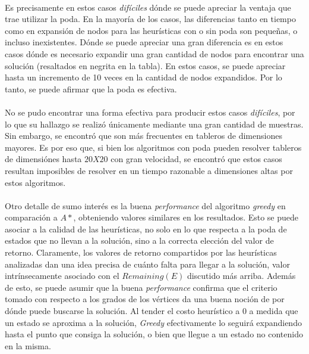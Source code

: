 \documentclass[12pt, twocolumn]{article}
\begin{document}
\paragraph{} Es precisamente en estos casos \textit{difíciles} dónde se puede apreciar la ventaja que trae utilizar
la poda. En la mayoría de los casos, las diferencias tanto en tiempo como en expansión de nodos
para las heurísticas con o sin poda son pequeñas, o incluso inexistentes. Dónde se puede apreciar
una gran diferencia es en estos casos dónde es necesario expandir una gran cantidad de nodos para
encontrar una solución (resaltados en negrita en la tabla). En estos casos, se puede apreciar hasta
un incremento de 10 veces en la cantidad de nodos expandidos. Por lo tanto, se puede afirmar que la 
poda es efectiva.

\paragraph{} No se pudo encontrar una forma efectiva para producir estos casos \textit{difíciles}, por lo que su hallazgo se realizó únicamente mediante una gran cantidad de muestras. Sin embargo, se encontró que son más frecuentes
en tableros de dimensiones mayores. Es por eso que, si bien los algoritmos con poda pueden resolver
tableros de dimensiónes hasta $20X20$ con gran velocidad, se encontró que estos casos resultan
imposibles de resolver en un tiempo razonable a dimensiones altas por estos algoritmos.

\paragraph{} Otro detalle de sumo interés es la buena \textit{performance} del algoritmo \textit{greedy} en comparación a $A*$, obteniendo valores similares en los resultados. Esto se puede asociar a la calidad de las heurísticas, no solo en lo que respecta a la poda de estados que no llevan a la solución, sino a la correcta elección del valor de retorno. Claramente, los valores de retorno compartidos por las heurísticas analizadas dan una idea precisa de cuánto falta para llegar a la solución, valor intrínsecamente asociado con el $Remaining(E)$ discutido más arriba. Además de esto, se puede asumir que la buena \textit{performance} confirma que el criterio tomado con respecto a los grados de los vértices da una buena noción de por dónde puede buscarse la solución. Al tender el costo heurístico a $0$ a medida que un estado se aproxima a la solución, \textit{Greedy} efectivamente lo seguirá expandiendo hasta el punto que consiga la solución, o bien que llegue a un estado no contenido en la misma.  
\end{document}
